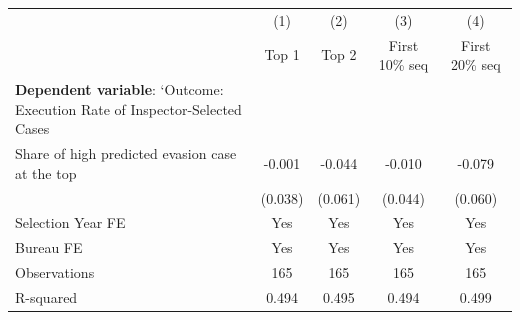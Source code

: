 {
\def\sym#1{\ifmmode^{#1}\else\(^{#1}\)\fi}
\begin{tabular}{l*{4}{c}}
\toprule
            &\multicolumn{1}{c}{(1)}&\multicolumn{1}{c}{(2)}&\multicolumn{1}{c}{(3)}&\multicolumn{1}{c}{(4)}\\
            &\multicolumn{1}{c}{Top 1}&\multicolumn{1}{c}{Top 2}&\multicolumn{1}{c}{First 10\% seq}&\multicolumn{1}{c}{First 20\% seq}\\
\midrule
\textbf{Dependent variable}: `Outcome: Execution Rate of Inspector-Selected Cases&                     &                     &                     &                     \\
\addlinespace
Share of high predicted evasion case at the top&      -0.001         &      -0.044         &      -0.010         &      -0.079         \\
            &     (0.038)         &     (0.061)         &     (0.044)         &     (0.060)         \\
\midrule
Selection Year FE&         Yes         &         Yes         &         Yes         &         Yes         \\
Bureau FE   &         Yes         &         Yes         &         Yes         &         Yes         \\
Observations&         165         &         165         &         165         &         165         \\
R-squared   &       0.494         &       0.495         &       0.494         &       0.499         \\
\bottomrule
\end{tabular}
}
